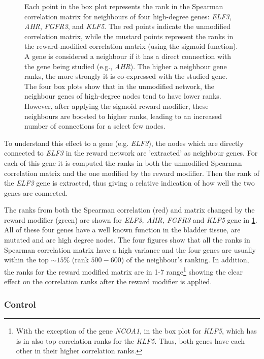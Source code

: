 \begin{figure}[!t]
    \caption[Spearman ranks of neighbour genes]{Each point in the box plot represents the rank in the Spearman correlation matrix for neighbours of four high-degree genes: \textit{ELF3}, \textit{AHR}, \textit{FGFR3}, and \textit{KLF5}. The red points indicate the unmodified correlation matrix, while the mustard points represent the ranks in the reward-modified correlation matrix (using the sigmoid function). A gene is considered a neighbour if it has a direct connection with the gene being studied (e.g., \textit{AHR}). The higher a neighbour gene ranks, the more strongly it is co-expressed with the studied gene. The four box plots show that in the unmodified network, the neighbour genes of high-degree nodes tend to have lower ranks. However, after applying the sigmoid reward modifier, these neighbours are boosted to higher ranks, leading to an increased number of connections for a select few nodes.}
    \label{fig:N_II:corr_analysis}
\end{figure}


To understand this effect to a gene (e.g. \textit{ELF3}), the nodes which are directly connected to \textit{ELF3} in the reward network are 'extracted' as neighbour genes. For each of this gene it is computed the ranks in both the unmodified Spearman correlation matrix and the one modified by the reward modifier. Then the rank of the \textit{ELF3} gene is extracted, thus giving a relative indication of how well the two genes are connected.

The ranks from both the Spearman correlation (red) and matrix changed  by the reward modifier (green) are shown for \textit{ELF3, AHR, FGFR3} and \textit{KLF5} gene in \cref{fig:N_II:corr_analysis}. All of these four genes have a well known function in the bladder tissue, are mutated and are high degree nodes. The four figures show that all the ranks in Spearman correlation matrix have a high variance and the four genes are usually within the top $\sim15\%$ (rank $500-600$) of the neighbour's ranking. In addition, the ranks for the reward modified matrix are in 1-7 range\footnote{With the exception of the gene \textit{NCOA1}, in the box plot for \textit{KLF5}, which has is in also top correlation ranks for the \textit{KLF5}. Thus, both genes have each other in their higher correlation ranks.} showing the clear effect on the correlation ranks after the reward modifier is applied. 

\subsubsection*{Control}

